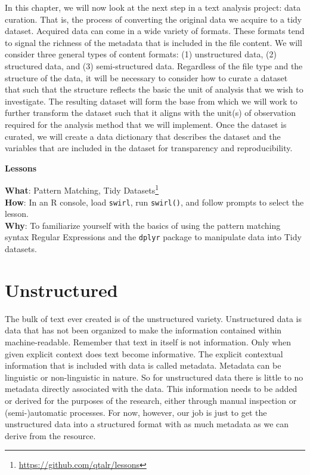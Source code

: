\documentclass[
  letterpaper,
]{latex/krantz}
\theoremstyle{definition}
\theoremstyle{remark}
\DeclareRobustCommand{\href}[2]{#2\footnote{\url{#1}}}
\begin{document}
In this chapter, we will now look at the next step in a text analysis
project: data curation. That is, the process of converting the original
data we acquire to a tidy dataset. Acquired data can come in a wide
variety of formats. These formats tend to signal the richness of the
metadata that is included in the file content. We will consider three
general types of content formats: (1) unstructured data, (2) structured
data, and (3) semi-structured data. Regardless of the file type and the
structure of the data, it will be necessary to consider how to curate a
dataset that such that the structure reflects the basic the unit of
analysis that we wish to investigate. The resulting dataset will form
the base from which we will work to further transform the dataset such
that it aligns with the unit(s) of observation required for the analysis
method that we will implement. Once the dataset is curated, we will
create a data dictionary that describes the dataset and the variables
that are included in the dataset for transparency and reproducibility.

\begin{tcolorbox}[enhanced jigsaw, colback=white, colframe=quarto-callout-color-frame, leftrule=.75mm, opacityback=0, rightrule=.15mm, bottomrule=.15mm, toprule=.15mm, breakable, left=2mm, arc=.35mm]

\textbf{ Lessons}

\textbf{What}: \href{https://github.com/qtalr/lessons}{Pattern Matching,
Tidy Datasets}\\
\textbf{How}: In an R console, load \texttt{swirl}, run
\texttt{swirl()}, and follow prompts to select the lesson.\\
\textbf{Why}: To familiarize yourself with the basics of using the
pattern matching syntax Regular Expressions and the \texttt{dplyr}
package to manipulate data into Tidy datasets.

\end{tcolorbox}

\section{Unstructured}\label{unstructured}

The bulk of text ever created is of the unstructured variety.
Unstructured data is data that has not been organized to make the
information contained within machine-readable. Remember that text in
itself is not information. Only when given explicit context does text
become informative. The explicit contextual information that is included
with data is called metadata. Metadata can be linguistic or
non-linguistic in nature. So for unstructured data there is little to no
metadata directly associated with the data. This information needs to be
added or derived for the purposes of the research, either through manual
inspection or (semi-)automatic processes. For now, however, our job is
just to get the unstructured data into a structured format with as much
metadata as we can derive from the resource.
\end{document}
